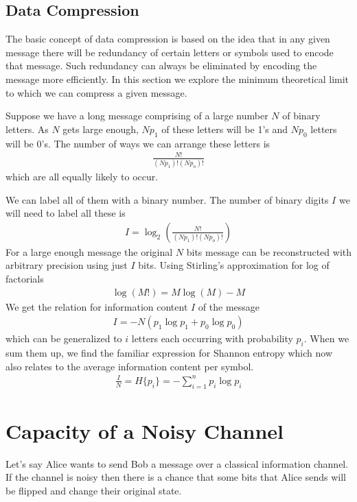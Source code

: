 \subsection{Data Compression}
\par The basic concept of data compression is based on the idea that in any given message there will be redundancy of certain letters or symbols used to encode that message. Such redundancy can always be eliminated by encoding the message more efficiently. In this section we explore the minimum theoretical limit to which we can compress a given message.
\par Suppose we have a long message comprising of a large number $N$ of binary letters. As $N$ gets large enough, $N p_1$ of these letters will be 1's and $N p_0$ letters will be 0's. The number of ways we can arrange these letters is
\begin{align*}
\frac{N!}{(N p_1)!(N p_o)!}
\end{align*}
which are all equally likely to occur.
\par We can label all of them with a binary number. The number of binary digits $I$ we will need to label all these is
\begin{align*}
I = \log_2 (\frac{N!}{(N p_1)!(N p_o)!})
\end{align*}
For a large enough message the original $N$ bits message can be reconstructed with arbitrary precision using just $I$ bits.
Using Stirling's approximation for log of factorials
\begin{align*}
\log(M!) = M \log(M) - M
\end{align*}
We get the relation for information content $I$ of the message
\begin{align*}
I = -N ( p_1 \log p_1 + p_0 \log p_0 )
\end{align*}
which can be generalized to $i$ letters each occurring with probability $p_i$. When we sum them up, we find the familiar expression for Shannon entropy which now also relates to the average information content per symbol.
\begin{align*}
\frac{I}{N} = H\{p_i\} = - \sum_{i=1}^{n} p_i \log p_i
\end{align*}

\section{Capacity of a Noisy Channel}
\par Let's say Alice wants to send Bob a message over a classical information channel. If the channel is noisy then there is a chance that some bits that Alice sends will be flipped and change their original state.

